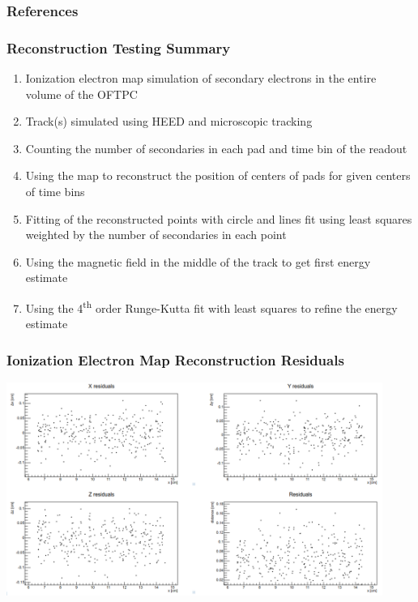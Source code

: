 \documentclass{beamer}
\begin{document}
	\begin{frame}
		\frametitle{References}
		
		
	\end{frame}
	\begin{frame}[noframenumbering]
		\frametitle{Reconstruction Testing Summary}
		\begin{enumerate}
			\item Ionization electron map simulation of secondary electrons in the entire volume of the OFTPC
			\item Track(s) simulated using HEED and microscopic tracking
			\item Counting the number of secondaries in each pad and time bin of the readout
			\item Using the map to reconstruct the position of centers of pads for given centers of time bins
			\item Fitting of the reconstructed points with circle and lines fit using least squares weighted by the number of secondaries in each point
			\item Using the magnetic field in the middle of the track to get first energy estimate
			\item Using the 4\textsuperscript{th} order Runge-Kutta fit with least squares to refine the energy estimate
		\end{enumerate}
	\end{frame}
	\begin{frame}[noframenumbering]
		\frametitle{Ionization Electron Map Reconstruction Residuals}
		\centering
		\includegraphics[width=0.92\textwidth]{../images/res_graphs.png}
	\end{frame}
\end{document}
